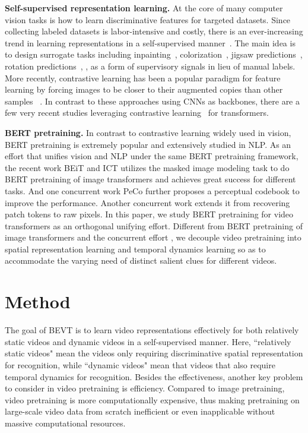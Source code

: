 \documentclass[10pt,twocolumn,letterpaper]{article}
\makeatletter
\newcommand*{\system}{BEVT\@\xspace}
\makeatother
\begin{document}
\vspace{0.05in}
\noindent\textbf{Self-supervised representation learning.} At the core of many computer vision tasks is how to learn discriminative features for targeted datasets. Since collecting labeled datasets is labor-intensive and costly, there is an ever-increasing trend in learning representations in a self-supervised manner~\cite{caron2018deepcluster,donahue2019bigbigan,caron2020swav,2020byol,li2021pcl,zbontar2021barlowtwins}.  The main idea is to design surrogate tasks including
 inpainting~\cite{pathak2016inpainting}, colorization~\cite{zhang2016colorful,zhang2017split}, jigsaw predictions~\cite{noroozi2016jigsaw}, rotation predictions~\cite{gidaris2018rotnet}, \etc,  as a form of supervisory signals in lieu of manual labels. More recently, contrastive learning has been a popular paradigm for feature learning by forcing images to be closer to their augmented copies than other samples ~\cite{wu2018npid,ye2019e2e,he2019moco,misra2020pirl,chen2020simclr}. In contrast to these approaches using CNNs as backbones, there are a few very recent studies leveraging contrastive learning~\cite{caron2021emerging,chen2021empirical} for transformers. 
 
\vspace{0.05in}
\noindent\textbf{BERT pretraining.} In contrast to contrastive learning widely used in vision, BERT pretraining \cite{devlin2018bert} is extremely popular and extensively studied \cite{liu2019roberta,bao2020unilmv2} in NLP. As an effort that unifies vision and NLP under the same BERT pretraining framework, the recent work BEiT \cite{bao2021beit} and ICT \cite{wan2021high} utilizes the masked image modeling task to do BERT pretraining of image transformers and achieves great success for different tasks. And one concurrent work PeCo \cite{dong2021peco} further proposes a perceptual codebook to improve the performance. Another concurrent work \cite{he2021masked} extends it from recovering patch tokens to raw pixels. In this paper, we study BERT pretraining for video transformers as an orthogonal unifying effort. Different from BERT pretraining of image transformers and the concurrent effort \cite{tan2021vimpac}, we decouple video pretraining into spatial representation learning and temporal dynamics learning so as to accommodate the varying need of distinct salient clues for different videos. 

 
\section{Method}
The goal of \system is to learn video representations effectively for both relatively static videos and dynamic videos in a self-supervised manner. Here, ``relatively static videos" mean the videos only requiring discriminative spatial representation for recognition, while ``dynamic videos" mean that videos that also require temporal dynamics for recognition. Besides the effectiveness, another key problem to consider in video pretraining is efficiency. Compared to image pretraining, video pretraining is more computationally expensive, thus making pretraining on large-scale video data from scratch inefficient or even inapplicable without massive computational resources.
\end{document}
